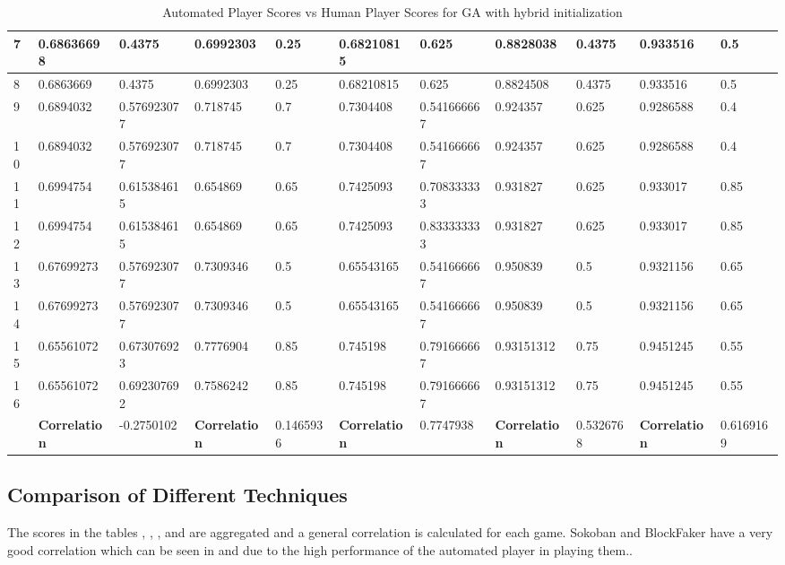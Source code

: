 \begin{landscape}
\begin{table}[!ht]
\begin{tabular}{|p{0.5in}|p{0.75in}|p{0.75in}|p{0.75in}|p{0.75in}|p{0.75in}|p{0.75in}|p{0.75in}|p{0.75in}|p{0.75in}|p{0.75in}|}
		\hline
		7 & 0.68636698 & 0.4375 & 0.6992303 & 0.25 & 0.68210815 & 0.625 & 0.8828038 & 0.4375 & 0.933516 & 0.5\\
		\hline
		8 & 0.6863669 & 0.4375 & 0.6992303 & 0.25 & 0.68210815 & 0.625 & 0.8824508 & 0.4375 & 0.933516 & 0.5\\
		\hline
		9 & 0.6894032 & 0.576923077 & 0.718745 & 0.7 & 0.7304408 & 0.541666667 & 0.924357 & 0.625 & 0.9286588 & 0.4\\
		\hline
		10 & 0.6894032 & 0.576923077 & 0.718745 & 0.7 & 0.7304408 & 0.541666667 & 0.924357 & 0.625 & 0.9286588 & 0.4\\
		\hline
		11 & 0.6994754 & 0.615384615 & 0.654869 & 0.65 & 0.7425093 & 0.708333333 & 0.931827 & 0.625 & 0.933017 & 0.85\\
		\hline
		12 & 0.6994754 & 0.615384615 & 0.654869 & 0.65 & 0.7425093 & 0.833333333 & 0.931827 & 0.625 & 0.933017 & 0.85\\
		\hline
		13 & 0.67699273 & 0.576923077 & 0.7309346 & 0.5 & 0.65543165 & 0.541666667 & 0.950839 & 0.5 & 0.9321156 & 0.65\\
		\hline
		14 & 0.67699273 & 0.576923077 & 0.7309346 & 0.5 & 0.65543165 & 0.541666667 & 0.950839 & 0.5 & 0.9321156 & 0.65\\
		\hline
		15 & 0.65561072 & 0.673076923 & 0.7776904 & 0.85 & 0.745198 & 0.791666667 & 0.93151312 & 0.75 & 0.9451245 & 0.55\\
		\hline
		16 & 0.65561072 & 0.692307692 & 0.7586242 & 0.85 & 0.745198 & 0.791666667 & 0.93151312 & 0.75 & 0.9451245 & 0.55\\
		\hline
		& \textbf{Correlation} & -0.2750102 & \textbf{Correlation} & 0.1465936 & \textbf{Correlation} & 0.7747938 & \textbf{Correlation} & 0.5326768 & \textbf{Correlation} & 0.6169169\\
		\hline
	\end{tabular}
	\caption{Automated Player Scores vs Human Player Scores for GA with hybrid initialization}
	\label{Table:mixedGAScores}
\end{table}
\end{landscape}

\subsection{Comparison of Different Techniques}
The scores in the tables , , , and  are aggregated and a general correlation is calculated for each game. Sokoban and BlockFaker have a very good correlation which can be seen in  and  due to the high performance of the automated player in playing them..

